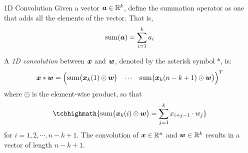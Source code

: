 %
%
%
\begin{frame}{1D Convolution}
Given a vector ${\boldsymbol a} \in {\mathord{\mathbb R}}^k$, define the summation operator as one
that adds all the elements of the vector. That is,
\begin{align*}
    \operatorname*{sum}({\boldsymbol a}) = \sum_{i=1}^k a_i
\end{align*}

A {\em 1D convolution} between ${\boldsymbol x}$ and ${\boldsymbol w}$, denoted by the asterisk symbol
$\ast$, is:
\begin{equation*}
    {\boldsymbol x} \ast {\boldsymbol w} = \begin{pmatrix} &&\\[-1em]
    \operatorname*{sum}\bigl({\boldsymbol x}_k(1) \odot {\boldsymbol w}\bigr) &
        \cdots &
        \operatorname*{sum}\bigl({\boldsymbol x}_k({n-k+1}) \odot {\boldsymbol w}\bigr)\\[-1em]
&& \end{pmatrix}^T
\end{equation*}
where $\odot$ is the element-wise product, so that
\begin{align*}
    \tcbhighmath{
    \summ\bigl(\bx_k(i) \odot \bw\bigr) = \sum_{j=1}^k x_{i+j-1} \cdot
w_j }
\end{align*}
for $i=1,2,\cdots,n-k+1$. 
The convolution of ${\boldsymbol x} \in {\mathord{\mathbb R}}^n$ and ${\boldsymbol w} \in
{\mathord{\mathbb R}}^k$ results in a vector of length $n-k+1$.
\end{frame}
